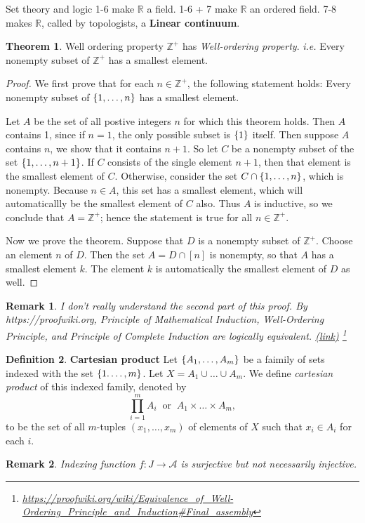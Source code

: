 \documentclass{report}
\newcommand*{\link}[1]{\href{#1}{(\underline{link})}%
  \footnote{\url{#1}}}
\newtheorem*{remark}{Remark}
\theoremstyle{definition}
\newtheorem{theorem}{Theorem}[chapter]
\newtheorem{definition}[theorem]{Definition}
\newcommand{\defn}[1]{\textbf{#1}\label{#1}\index{#1}}
\newcommand{\set}[1]{\ensuremath\{#1\}}
\newcommand{\ie}{\textit{i.e.}\xspace}
\newcommand{\ZZ}{\mathbb{Z}}
\newcommand{\RR}{\mathbb{R}}
\newcommand{\A}{$A$\xspace}
\begin{document}
\begin{chapter}{Set theory and logic}
  1-6 make $\RR$ a field. 1-6 + 7 make $\RR$ an ordered field. 7-8
  makes $\RR$, called by topologists, a \defn{Linear continuum}.

  \begin{theorem}{Well ordering property}
    $\ZZ^+$ has \emph{Well-ordering property}. \ie Every nonempty
    subset of $\ZZ^+$ has a smallest element.
  \end{theorem}
  \begin{proof}
    We first prove that for each $n\in\ZZ^+$, the following statement
    holds: Every nonempty subset of $\set{1,\ldots,n}$ has a smallest
    element.

    Let $A$ be the set of all postive integers $n$ for which this
    theorem holds. Then \A contains 1, since if $n=1$, the only
    possible subset is $\set{1}$ itself. Then suppose \A contains $n$,
    we show that it contains $n+1$. So let $C$ be a nonempty subset of
    the set $\set{1,\ldots,n+1}$. If $C$ consists of the single
    element $n+1$, then that element is the smallest element of
    $C$. Otherwise, consider the set $C\cap\set{1,\ldots,n}$, which is
    nonempty. Because $n\in A$, this set has a smallest element, which
    will automaticallly be the smallest element of $C$ also. Thus $A$
    is inductive, so we conclude that $A=\ZZ^+$; hence the statement
    is true for all $n\in\ZZ^+$.

    Now we prove the theorem. Suppose that $D$ is a nonempty subset of
    $\ZZ^+$. Choose an element $n$ of $D$. Then the set $A=D\cap[n]$
    is nonempty, so that $A$ has a smallest element $k$. The element
    $k$ is automatically the smallest element of $D$ as well.
  \end{proof}
  \begin{remark}
    I don't really understand the second part of this proof. By
    {\textup{https://proofwiki.org}}, Principle of Mathematical
    Induction, Well-Ordering Principle, and Principle of Complete
    Induction are logically equivalent.
    \link{https://proofwiki.org/wiki/Equivalence_of_Well-Ordering_Principle_and_Induction\#Final_assembly}
  \end{remark}

  \begin{definition}{\defn{Cartesian product}}
    Let $\set{A_1,\ldots,A_m}$ be a faimily of sets indexed with the
    set $\set{1.\ldots,m}$. Let $X=A_1\cup\dots\cup A_m$. We define
    \emph{cartesian product} of this indexed family, denoted by
    $$\prod_{i=1}^mA_i\;\;\text{or}\;\;A_1\times \dots \times A_m,$$
    to be the set of all $m$-tuples $(x_1,\ldots,x_m)$ of elements of
    $X$ such that $x_i\in A_i$ for each $i$.
  \end{definition}
  \begin{remark}
    Indexing function $f:J\to\mathcal{A}$ is surjective but not
    necessarily injective.
  \end{remark}


\end{chapter}
\end{document}

